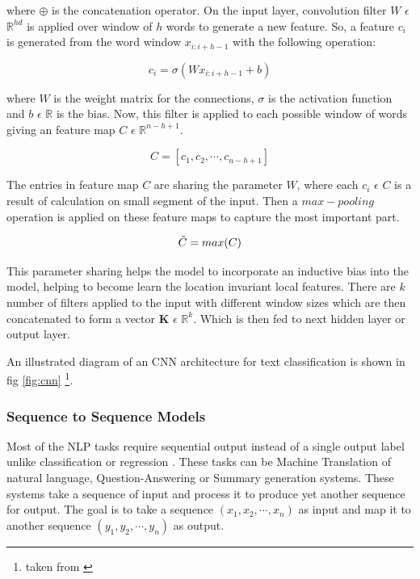 where $\oplus$ is the concatenation operator. On the input layer, convolution filter $W$  $\epsilon$ $\mathbb{R}^{hd}$ is applied over window of $h$ words to generate a new feature. So, a feature $c_{i}$ is generated from the word window $x_{i:i+h-1}$ with the following operation:

\begin{equation}
    c_{i} = \sigma (Wx_{i:i+h-1} + b)
\end{equation}

where $W$ is the weight matrix for the connections, $\sigma$ is the activation function and $b$ $\epsilon$ $\mathbb{R}$ is the bias. Now, this filter is applied to each possible window of words giving an feature map $C$ $\epsilon$ $\mathbb{R}^{n-h+1}$.

\begin{equation}
    C = [c_{1}, c_{2}, \cdots, c_{n-h+1}]
\end{equation}

The entries in feature map $C$ are sharing the parameter $W$, where each $c_{i}$ $\epsilon$ $C$ is a result of calculation on small segment of the input. Then a $max-pooling$ operation is applied on these feature maps to capture the most important part.

\begin{equation}
    \Tilde{C} = max(C)
\end{equation}

This parameter sharing helps the model to incorporate an inductive bias into the model, helping to become learn the location invariant local features. There are $k$ number of filters applied to the input with different window sizes which are then concatenated to form a vector $\textbf{K}$ $\epsilon$ $\mathbb{R}^k$. Which is then fed to next hidden layer or output layer.

An illustrated diagram of an CNN architecture for text classification is shown in fig \cref{fig:cnn} \footnote{taken from \cite{kim2014convolutional}}.

\subsubsection{Sequence  to Sequence Models}
Most of the NLP tasks require sequential output instead of a single output label unlike classification or regression \cite{sutskever2014sequence}. These tasks can be Machine Translation of natural language, Question-Answering or Summary generation systems. These systems take a sequence of input and process it to produce yet another sequence for output. The goal is to take a sequence $(x_{1}, x_{2}, \cdots, x_{n})$ as input and map it to another sequence $(y_{1}, y_{2}, \cdots, y_{n})$ as output.

